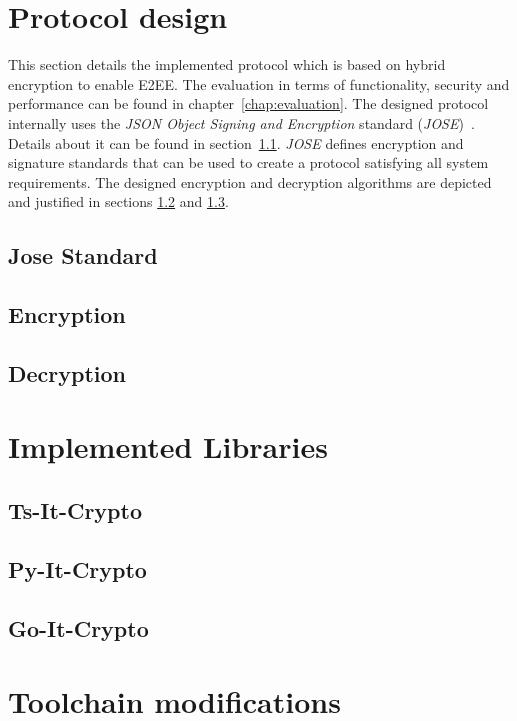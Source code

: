 \documentclass[../main.tex]{subfiles}
\begin{document}
\section{Protocol design}
\label{sec:protocol-design}

This section details the implemented protocol which is based on hybrid encryption to enable E2EE.
The evaluation in terms of functionality, security and performance can be found in chapter~\ref{chap:evaluation}.
The designed protocol internally uses the \textit{JSON Object Signing and Encryption} standard (\textit{JOSE})~\cite{Barnes2014}.
Details about it can be found in section~\ref{sec:jose}.
\textit{JOSE} defines encryption and signature standards that can be used to create a protocol satisfying all system requirements.
The designed encryption and decryption algorithms are depicted and justified in sections \ref{sec:encryption} and \ref{sec:decryption}. 

\subsection{Jose Standard}
\label{sec:jose}

\subsection{Encryption}
\label{sec:encryption}

\subsection{Decryption}
\label{sec:decryption}

\section{Implemented Libraries}
\label{sec:implemented-libraries}

\subsection{Ts-It-Crypto}

\subsection{Py-It-Crypto}

\subsection{Go-It-Crypto}

\section{Toolchain modifications}
\label{sec:toolchain-modifications}
\end{document}

